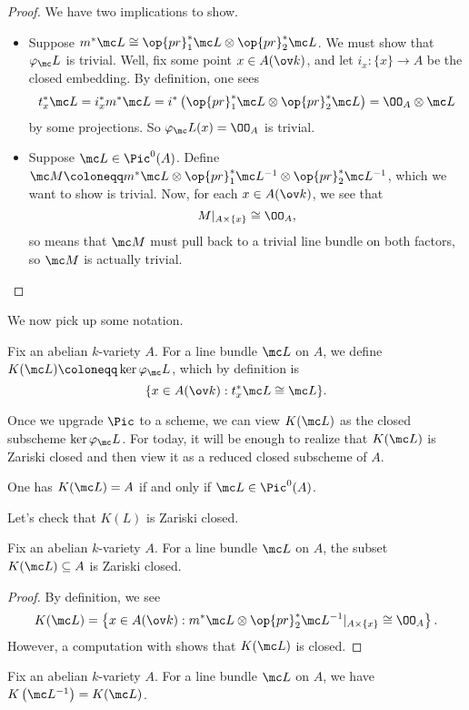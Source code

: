 \documentclass[../notes.tex]{subfiles}
\begin{document}
\begin{proof}
	We have two implications to show.
	\begin{itemize}
		\item Suppose $m^*\mc L\cong\op{pr}_1^*\mc L\otimes\op{pr}_2^*\mc L$. We must show that $\varphi_\mc L$ is trivial. Well, fix some point $x\in A(\ov k)$, and let $i_x\colon\{x\}\to A$ be the closed embedding. By definition, one sees
		\[t_x^*\mc L=i^*_xm^*\mc L=i^*\left(\op{pr}_1^*\mc L\otimes\op{pr}_2^*\mc L\right)=\OO_A\otimes\mc L\]
		by some projections. %
		So $\varphi_\mc L(x)=\OO_A$ is trivial.
		\item Suppose $\mc L\in\Pic^0(A)$. Define $\mc M\coloneqq m^*\mc L\otimes\op{pr}_1^*\mc L^{-1}\otimes\op{pr}_2^*\mc L^{-1}$, which we want to show is trivial. Now, for each $x\in A(\ov k)$, we see that
		\[M|_{A\times\{x\}}\cong\OO_A,\]
		so  means that $\mc M$ must pull back to a trivial line bundle on both factors, so $\mc M$ is actually trivial.
		\qedhere
	\end{itemize}
\end{proof}
We now pick up some notation.
\begin{definition}
	Fix an abelian $k$-variety $A$. For a line bundle $\mc L$ on $A$, we define $K(\mc L)\coloneqq\ker\varphi_\mc L$, which by definition is
	\[\{x\in A(\ov k):t_x^*\mc L\cong\mc L\}.\]
\end{definition}
\begin{remark}
	Once we upgrade $\Pic$ to a scheme, we can view $K(\mc L)$ as the closed subscheme $\ker\varphi_\mc L$. For today, it will be enough to realize that $K(\mc L)$ is Zariski closed and then view it as a reduced closed subscheme of $A$.
\end{remark}
\begin{remark}
	One has $K(\mc L)=A$ if and only if $\mc L\in\Pic^0(A)$.
\end{remark}
Let's check that $K(L)$ is Zariski closed.
\begin{lemma}
	Fix an abelian $k$-variety $A$. For a line bundle $\mc L$ on $A$, the subset $K(\mc L)\subseteq A$ is Zariski closed.
\end{lemma}
\begin{proof}
	By definition, we see
	\[K(\mc L)=\left\{x\in A(\ov k):m^*\mc L\otimes\op{pr}_2^*\mc L^{-1}|_{A\times\{x\}}\cong\OO_A\right\}.\]
	However, a computation with  shows that $K(\mc L)$ is closed.
\end{proof}
\begin{lemma}
	Fix an abelian $k$-variety $A$. For a line bundle $\mc L$ on $A$, we have $K\left(\mc L^{-1}\right)=K(\mc L)$.
\end{lemma}
\end{document}
